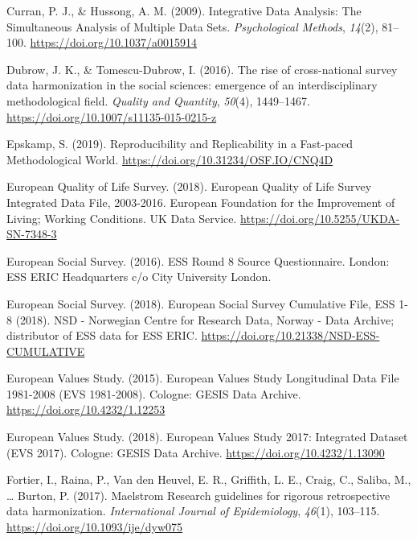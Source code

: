 \documentclass[12pt,]{article}
\begin{document}
\leavevmode\hypertarget{ref-Curran2009}{}%
Curran, P. J., \& Hussong, A. M. (2009). Integrative Data Analysis: The Simultaneous Analysis of Multiple Data Sets. \emph{Psychological Methods}, \emph{14}(2), 81--100. \url{https://doi.org/10.1037/a0015914}

\leavevmode\hypertarget{ref-Dubrow2016}{}%
Dubrow, J. K., \& Tomescu-Dubrow, I. (2016). The rise of cross-national survey data harmonization in the social sciences: emergence of an interdisciplinary methodological field. \emph{Quality and Quantity}, \emph{50}(4), 1449--1467. \url{https://doi.org/10.1007/s11135-015-0215-z}

\leavevmode\hypertarget{ref-Epskamp2019}{}%
Epskamp, S. (2019). Reproducibility and Replicability in a Fast-paced Methodological World. \url{https://doi.org/10.31234/OSF.IO/CNQ4D}

\leavevmode\hypertarget{ref-EQLS2018}{}%
European Quality of Life Survey. (2018). European Quality of Life Survey Integrated Data File, 2003-2016. European Foundation for the Improvement of Living; Working Conditions. UK Data Service. \url{https://doi.org/10.5255/UKDA-SN-7348-3}

\leavevmode\hypertarget{ref-ESS2016b}{}%
European Social Survey. (2016). ESS Round 8 Source Questionnaire. London: ESS ERIC Headquarters c/o City University London.

\leavevmode\hypertarget{ref-ESS2018}{}%
European Social Survey. (2018). European Social Survey Cumulative File, ESS 1-8 (2018). NSD - Norwegian Centre for Research Data, Norway - Data Archive; distributor of ESS data for ESS ERIC. \url{https://doi.org/10.21338/NSD-ESS-CUMULATIVE}

\leavevmode\hypertarget{ref-EVS2015}{}%
European Values Study. (2015). European Values Study Longitudinal Data File 1981-2008 (EVS 1981-2008). Cologne: GESIS Data Archive. \url{https://doi.org/10.4232/1.12253}

\leavevmode\hypertarget{ref-EVS2018}{}%
European Values Study. (2018). European Values Study 2017: Integrated Dataset (EVS 2017). Cologne: GESIS Data Archive. \url{https://doi.org/10.4232/1.13090}

\leavevmode\hypertarget{ref-Fortier2017a}{}%
Fortier, I., Raina, P., Van den Heuvel, E. R., Griffith, L. E., Craig, C., Saliba, M., \ldots{} Burton, P. (2017). Maelstrom Research guidelines for rigorous retrospective data harmonization. \emph{International Journal of Epidemiology}, \emph{46}(1), 103--115. \url{https://doi.org/10.1093/ije/dyw075}
\end{document}
